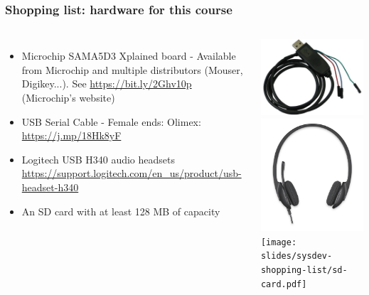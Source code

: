 \begin{frame}
\frametitle{Shopping list: hardware for this course}
  \begin{columns}
    \footnotesize
    \begin{itemize}
      \item Microchip SAMA5D3 Xplained board - Available from Microchip and
 	    multiple distributors (Mouser, Digikey...).
	    See \url{https://bit.ly/2Ghv10p} (Microchip's website)
      \item USB Serial Cable - Female ends:
	    Olimex: \url{https://j.mp/18Hk8yF} \\
      \item Logitech USB H340 audio headsets
	    \url{https://support.logitech.com/en_us/product/usb-headset-h340}
      \item An SD card with at least 128 MB of capacity
    \end{itemize}
    \includegraphics[height=0.20\textheight]{slides/sysdev-shopping-list/usb-serial-cable-female.png} \\
    \includegraphics[height=0.15\textheight]{slides/sysdev-shopping-list/logitech-h340.png} \\
    \texttt{[image: slides/sysdev-shopping-list/sd-card.pdf]}
  \end{columns}
\end{frame}

